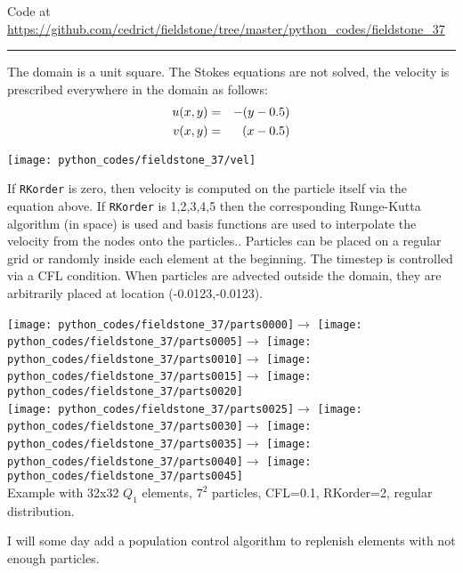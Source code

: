

\begin{center}
Code at \url{https://github.com/cedrict/fieldstone/tree/master/python_codes/fieldstone_37}
\end{center}

\par\noindent\rule{\textwidth}{0.4pt}


The domain is a unit square. The Stokes equations are not solved, the velocity is prescribed 
everywhere in the domain as follows:
\begin{eqnarray}
u(x,y)&=&-(y-0.5)\nonumber\\
v(x,y)&=&(x-0.5) \nonumber
\end{eqnarray}

\begin{center}
\texttt{[image: python\_codes/fieldstone\_37/vel]}
\end{center}

If {\tt RKorder} is zero, then velocity is computed on the particle itself via the equation above. 
If {\tt RKorder} is 1,2,3,4,5 then the corresponding Runge-Kutta algorithm (in space) is used and basis functions are
used to interpolate the velocity from the nodes onto the particles.. 
Particles can be placed on a regular grid or randomly inside each element at the beginning.
The timestep is controlled via a CFL condition.    
When particles are advected outside the domain, they are arbitrarily placed at location (-0.0123,-0.0123).

\begin{center}
\texttt{[image: python\_codes/fieldstone\_37/parts0000]}$\rightarrow$
\texttt{[image: python\_codes/fieldstone\_37/parts0005]}$\rightarrow$
\texttt{[image: python\_codes/fieldstone\_37/parts0010]}$\rightarrow$
\texttt{[image: python\_codes/fieldstone\_37/parts0015]}$\rightarrow$
\texttt{[image: python\_codes/fieldstone\_37/parts0020]}\\
\texttt{[image: python\_codes/fieldstone\_37/parts0025]}$\rightarrow$
\texttt{[image: python\_codes/fieldstone\_37/parts0030]}$\rightarrow$
\texttt{[image: python\_codes/fieldstone\_37/parts0035]}$\rightarrow$
\texttt{[image: python\_codes/fieldstone\_37/parts0040]}$\rightarrow$
\texttt{[image: python\_codes/fieldstone\_37/parts0045]}\\
{\captionfont Example with 32x32 $Q_1$ elements, $7^2$ particles, CFL=0.1, RKorder=2, regular distribution.}
\end{center}


I will some day add a population control algorithm to replenish elements with not enough particles.

